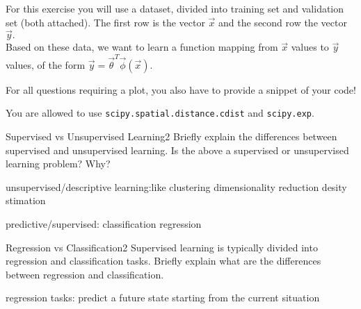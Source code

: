 For this exercise you will use a dataset, divided into training set and validation set (both attached). The first row is the vector $\vec x$ and the second row the vector $\vec y.$
\\
Based on these data, we want to learn a function mapping from $\vec x$ values to $\vec y$ values, of the form $\vec y=\vec{\theta}^{T}\vec{\phi}(\vec x)$.

For all questions requiring a plot, you also have to provide a snippet of your code!

You are allowed to use \texttt{scipy.spatial.distance.cdist} and \texttt{scipy.exp}.

\begin{questions}
	
	
	\begin{question}{Supervised vs Unsupervised Learning}{2}
		Briefly explain the differences between supervised and unsupervised learning. 
		Is the above a supervised or unsupervised learning problem? Why?

\begin{answer}


unsupervised/descriptive learning:like clustering dimensionality reduction desity stimation

predictive/supervised: classification regression


\end{answer}
	\end{question}
	
	
	
	\begin{question}{Regression vs Classification}{2}
		Supervised learning is typically divided into regression and classification tasks. 
		Briefly explain what are the differences between regression and classification.
		
\begin{answer}
	regression tasks: predict a future state starting from the current situation %
	

\end{answer}
\end{question}
\end{questions}
